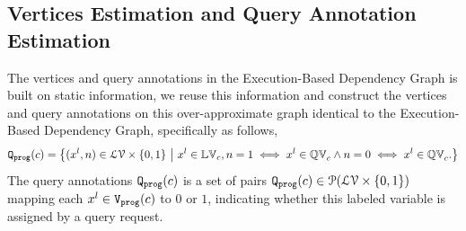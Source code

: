 \subsection{Vertices Estimation and Query Annotation Estimation}
\label{sec:alg_vertexgen}
The vertices and query annotations in the Execution-Based Dependency Graph is built on static information, 
we reuse this information and construct the vertices and query annotations on 
this  {over-}approximate graph identical to the Execution-Based Dependency Graph, specifically
as follows,
\[\progF(c) =\left\{(x^l, n)  \in  \mathcal{LV} \times \{0, 1\} 
~ \middle\vert ~
x^l \in \lvar_{c},
n = 1 \iff x^l \in \qvar_{c} \land n = 0 \iff  x^l \in \qvar_{c} .
\right\}\]
%
The query annotations $\mathtt{{Q_{prog}}}(c)$ is 
a set of pairs $\mathtt{{Q_{prog}}}(c) \in \mathcal{P}(\mathcal{LV} \times \{0, 1\} )$ 
mapping each $x^l \in \mathtt{{V_{prog}}}(c)$ to $0$ or $1$, indicating whether this labeled variable is assigned by a query request.

